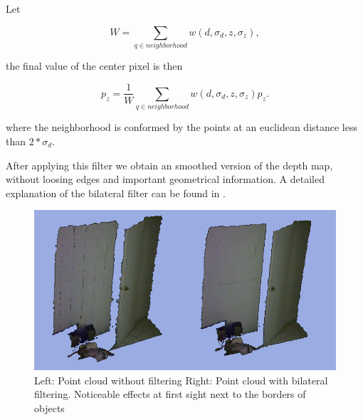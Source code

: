 Let 


$$ W = \sum\limits_{q \in neighborhood} {w(d,\sigma_d,z,\sigma_z)},$$

\noindent the final value of the center pixel is then

$$p_z = \frac{1}{W}\sum\limits_{q \in neighborhood}{w(d,\sigma_d,z,\sigma_z)p_z}.$$

\noindent where the neighborhood is conformed by the points at an euclidean distance less than $2*\sigma_d$.

After applying this filter we obtain an smoothed version of the depth map, without loosing edges and important geometrical information.
A detailed explanation of the bilateral filter can be found in \cite{TomasiBilateral}.

\begin{figure}[h!]
\begin{center}
\includegraphics[scale=0.35]{images/bilateral}
\end{center}
\caption{Left: Point cloud without filtering Right: Point cloud with bilateral filtering. Noticeable effects at first sight next to the borders of objects}
\end{figure}

